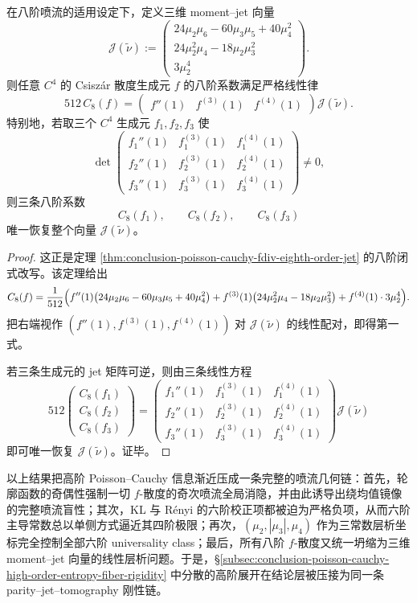 \begin{theorem}\label{thm:conclusion-poisson-cauchy-eighth-jet-linear-tomography}
在八阶喷流的适用设定下，定义三维 moment--jet 向量
\[
\mathcal J(\tilde\nu):=
\begin{pmatrix}
24\mu_2\mu_6-60\mu_3\mu_5+40\mu_4^2\\[1mm]
24\mu_2^2\mu_4-18\mu_2\mu_3^2\\[1mm]
3\mu_2^4
\end{pmatrix}.
\]
则任意 \(C^4\) 的 Csisz\'ar 散度生成元 \(f\) 的八阶系数满足严格线性律
\[
512\,C_8(f)
=
\begin{pmatrix}
f''(1)& f^{(3)}(1)& f^{(4)}(1)
\end{pmatrix}
\mathcal J(\tilde\nu).
\]
特别地，若取三个 \(C^4\) 生成元 \(f_1,f_2,f_3\) 使
\[
\det
\begin{pmatrix}
f_1''(1)&f_1^{(3)}(1)&f_1^{(4)}(1)\\
f_2''(1)&f_2^{(3)}(1)&f_2^{(4)}(1)\\
f_3''(1)&f_3^{(3)}(1)&f_3^{(4)}(1)
\end{pmatrix}\neq0,
\]
则三条八阶系数
\[
C_8(f_1),\qquad C_8(f_2),\qquad C_8(f_3)
\]
唯一恢复整个向量 \(\mathcal J(\tilde\nu)\)。
\end{theorem}
\begin{proof}
这正是定理 \ref{thm:conclusion-poisson-cauchy-fdiv-eighth-order-jet} 的八阶闭式改写。该定理给出
\[
C_8(f)
=
\frac1{512}\Bigl(
f''(1)\bigl(24\mu_2\mu_6-60\mu_3\mu_5+40\mu_4^2\bigr)
+f^{(3)}(1)\bigl(24\mu_2^2\mu_4-18\mu_2\mu_3^2\bigr)
+f^{(4)}(1)\cdot 3\mu_2^4
\Bigr).
\]
把右端视作 \((f''(1),f^{(3)}(1),f^{(4)}(1))\) 对 \(\mathcal J(\tilde\nu)\) 的线性配对，即得第一式。

若三条生成元的 jet 矩阵可逆，则由三条线性方程
\[
512
\begin{pmatrix}
C_8(f_1)\\
C_8(f_2)\\
C_8(f_3)
\end{pmatrix}
=
\begin{pmatrix}
f_1''(1)&f_1^{(3)}(1)&f_1^{(4)}(1)\\
f_2''(1)&f_2^{(3)}(1)&f_2^{(4)}(1)\\
f_3''(1)&f_3^{(3)}(1)&f_3^{(4)}(1)
\end{pmatrix}
\mathcal J(\tilde\nu)
\]
即可唯一恢复 \(\mathcal J(\tilde\nu)\)。证毕。
\end{proof}

\noindent
以上结果把高阶 Poisson--Cauchy 信息渐近压成一条完整的喷流几何链：首先，轮廓函数的奇偶性强制一切 \(f\)-散度的奇次喷流全局消隐，并由此诱导出绕均值镜像的完整喷流盲性；其次，KL 与 R\'enyi 的六阶校正项都被迫为严格负项，从而六阶主导常数总以单侧方式逼近其四阶极限；再次，\((\mu_2,|\mu_3|,\mu_4)\) 作为三常数层析坐标完全控制全部六阶 universality class；最后，所有八阶 \(f\)-散度又统一坍缩为三维 moment--jet 向量的线性层析问题。于是，\S\ref{subsec:conclusion-poisson-cauchy-high-order-entropy-fiber-rigidity} 中分散的高阶展开在结论层被压接为同一条 parity--jet--tomography 刚性链。

\endinput
